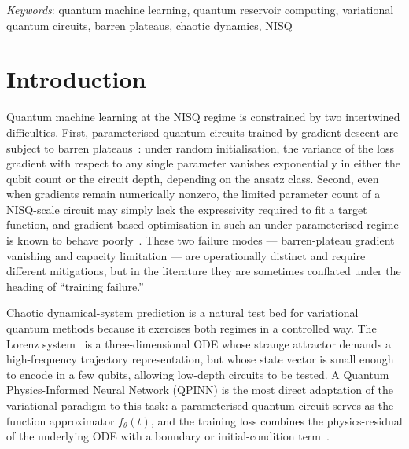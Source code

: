 \documentclass[a4paper,12pt]{iopart}
\begin{document}
\noindent\textit{Keywords}: quantum machine learning, quantum reservoir
computing, variational quantum circuits, barren plateaus, chaotic
dynamics, NISQ

\submitto{\QST}
\maketitle

\section{Introduction}

Quantum machine learning at the NISQ regime is constrained by two
intertwined difficulties.
First, parameterised quantum circuits trained by gradient descent are
subject to barren plateaus~\cite{mcclean2018,cerezo2021}: under random
initialisation, the variance of the loss gradient with respect to any
single parameter vanishes exponentially in either the qubit count or
the circuit depth, depending on the ansatz class.
Second, even when gradients remain numerically nonzero, the limited
parameter count of a NISQ-scale circuit may simply lack the expressivity
required to fit a target function, and gradient-based optimisation in
such an under-parameterised regime is known to behave
poorly~\cite{cerezo2021}.
These two failure modes --- barren-plateau gradient vanishing and
capacity limitation --- are operationally distinct and require
different mitigations, but in the literature they are sometimes
conflated under the heading of ``training failure.''

Chaotic dynamical-system prediction is a natural test bed for
variational quantum methods because it exercises both regimes in a
controlled way. The Lorenz system~\cite{lorenz1963} is a
three-dimensional ODE whose strange attractor demands a high-frequency
trajectory representation, but whose state vector is small enough to
encode in a few qubits, allowing low-depth circuits to be tested. A
Quantum Physics-Informed Neural Network (QPINN) is the most direct
adaptation of the variational paradigm to this task: a parameterised
quantum circuit serves as the function approximator $f_\theta(t)$, and
the training loss combines the physics-residual of the underlying ODE
with a boundary or initial-condition term~\cite{qcpinn2024,leung2022qpinn}.
\end{document}
